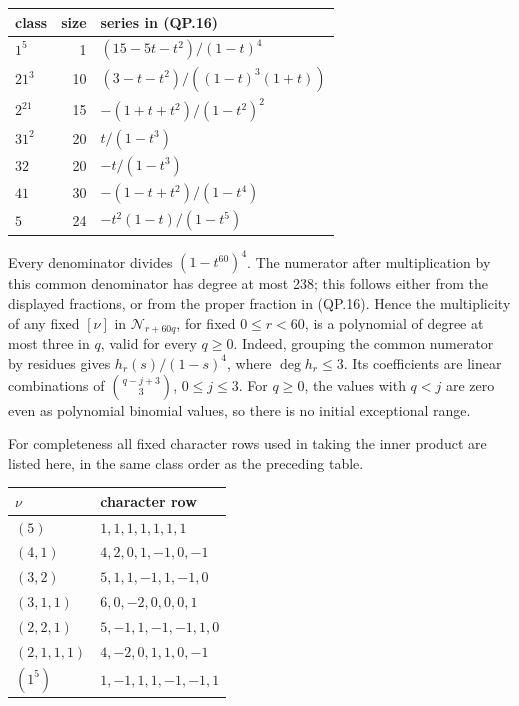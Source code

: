 \documentclass[
  10pt,
]{article}
\begin{document}
\begin{longtable}[]{@{}lrl@{}}
\toprule\noalign{}
class & size & series in (QP.16) \\
\midrule\noalign{}
\endhead
\bottomrule\noalign{}
\endlastfoot
\(1^5\) & 1 & \((15-5t-t^2)/(1-t)^4\) \\
\(21^3\) & 10 & \((3-t-t^2)/((1-t)^3(1+t))\) \\
\(2^21\) & 15 & \(-(1+t+t^2)/(1-t^2)^2\) \\
\(31^2\) & 20 & \(t/(1-t^3)\) \\
\(32\) & 20 & \(-t/(1-t^3)\) \\
\(41\) & 30 & \(-(1-t+t^2)/(1-t^4)\) \\
\(5\) & 24 & \(-t^2(1-t)/(1-t^5)\) \\
\end{longtable}

Every denominator divides \((1-t^{60})^4\). The numerator after
multiplication by this common denominator has degree at most 238; this
follows either from the displayed fractions, or from the proper fraction
in (QP.16). Hence the multiplicity of any fixed \([\nu]\) in
\(\mathcal N_{r+60q}\), for fixed \(0\le r<60\), is a polynomial of
degree at most three in \(q\), valid for every \(q\ge0\). Indeed,
grouping the common numerator by residues gives \(h_r(s)/(1-s)^4\),
where \(\deg h_r\le3\). Its coefficients are linear combinations of
\(\binom{q-j+3}{3}\), \(0\le j\le3\). For \(q\ge0\), the values with
\(q<j\) are zero even as polynomial binomial values, so there is no
initial exceptional range.

For completeness all fixed character rows used in taking the inner
product are listed here, in the same class order as the preceding table.

\begin{longtable}[]{@{}ll@{}}
\toprule\noalign{}
\(\nu\) & character row \\
\midrule\noalign{}
\endhead
\bottomrule\noalign{}
\endlastfoot
\((5)\) & \(1,1,1,1,1,1,1\) \\
\((4,1)\) & \(4,2,0,1,-1,0,-1\) \\
\((3,2)\) & \(5,1,1,-1,1,-1,0\) \\
\((3,1,1)\) & \(6,0,-2,0,0,0,1\) \\
\((2,2,1)\) & \(5,-1,1,-1,-1,1,0\) \\
\((2,1,1,1)\) & \(4,-2,0,1,1,0,-1\) \\
\((1^5)\) & \(1,-1,1,1,-1,-1,1\) \\
\end{longtable}
\end{document}
